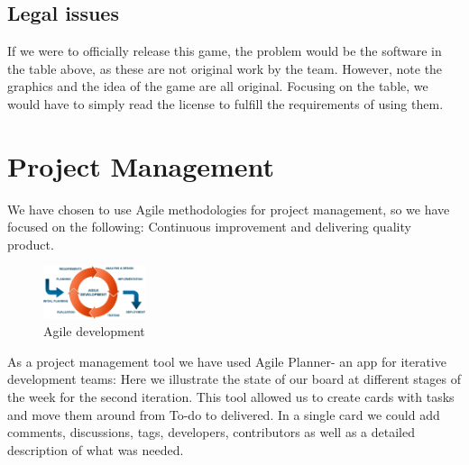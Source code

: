 \documentclass{article}
\renewcommand{\_}{\char`_}
\begin{document}
\subsection{Legal issues}
If we were to officially release this game, the problem would be the software in the table above,
as these are not original work by the team. However, note the graphics and the idea of the game are all original. Focusing on the table, we would have to simply read the license to fulfill the requirements of using them.

\section{Project Management}
We have chosen to use Agile methodologies for project management, so we have focused on the following: Continuous improvement and delivering quality product.

\begin{figure}[h!]
\includegraphics[width=3cm]{agile-development}
\centering
\caption{Agile development}
\end{figure}

As a project management tool we have used Agile Planner- an app for iterative development teams:
Here we illustrate the state of our board at different stages of the week for the second iteration.
This tool allowed us to create cards with tasks and move them around from To-do to delivered. In a single card we could add comments, discussions, tags, developers, contributors as well as a detailed description of what was needed.
\end{document}
